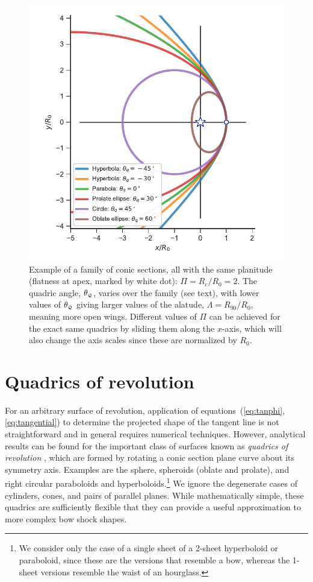 \begin{figure}
  \includegraphics[width=\linewidth]{figs/conic1}
  \caption{Example of a family of conic sections, all with the same
    planitude (flatness at apex, marked by white dot):
    \(\Pi = R_c/R_0 = 2 \). The quadric angle, \(\theta_{\scriptscriptstyle \mathcal{Q}}\), varies over
    the family (see text), with lower values of \(\theta_{\scriptscriptstyle \mathcal{Q}}\) giving
    larger values of the alatude, \(\Lambda = R_{90}/R_0 \), meaning more
    open wings.  Different values of \(\Pi\) can be achieved for the
    exact same quadrics by sliding them along the \(x\)-axis, which
    will also change the axis scales since these are normalized by
    \(R_0\).}
  \label{fig:conics-family}
\end{figure}


\section{Quadrics of revolution}
\label{sec:conic}


For an arbitrary surface of revolution, application of
equations~(\ref{eq:tanphi}, \ref{eq:tangential}) to determine the
projected shape of the tangent line is not straightforward and in
general requires numerical techniques.  However, analytical results
can be found for the important class of surfaces known as
\textit{quadrics of revolution} \citep{Goldman:1983a, Gfrerrer:2009a},
which are formed by rotating a conic section plane curve about its
symmetry axis.  Examples are the sphere, spheroids (oblate and
prolate), and right circular paraboloids and hyperboloids.\footnote{We
  consider only the case of a single sheet of a 2-sheet hyperboloid or
  paraboloid, since these are the versions that resemble a bow,
  whereas the 1-sheet versions resemble the waist of an hourglass.}
We ignore the degenerate cases of cylinders, cones, and pairs of
parallel planes.  While mathematically simple, these quadrics are
sufficiently flexible that they can provide a useful approximation to
more complex bow shock shapes.

